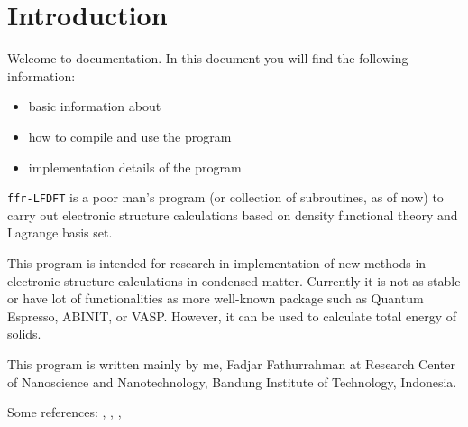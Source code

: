 \section{Introduction}

Welcome to \ffrLFDFT documentation.
In this document you will find the following information:
\begin{itemize}
\item basic information about \ffrLFDFT
\item how to compile and use the program
\item implementation details of the program
\end{itemize}

{\tt ffr-LFDFT} is a poor man's program (or collection of subroutines, as of now)
to carry out electronic structure calculations based on density functional theory
and Lagrange basis set.

This program is intended for research in implementation of new methods in
electronic structure calculations in condensed matter.
Currently it is not as stable or have lot of functionalities
as more well-known package such as Quantum Espresso, ABINIT, or VASP.
However, it can be used to calculate total energy of solids.

This program is written mainly by me, Fadjar Fathurrahman at Research Center
of Nanoscience and Nanotechnology, Bandung Institute of Technology, Indonesia.


Some references: \cite{Liu2003}, \cite{HeeSeungLee2006}, \cite{Ma2010},
\cite{Baye2015}
